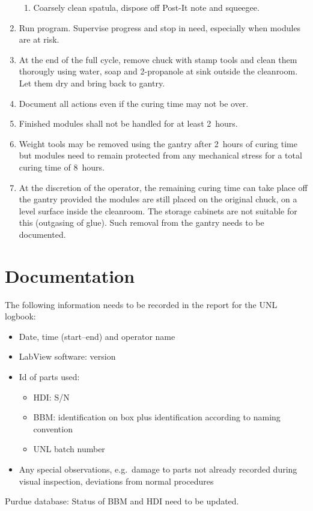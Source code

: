 \documentclass[12pt]{unlsilabsop}
\begin{document}
\begin{enumerate}
\begin{enumerate}
	\item Coarsely clean spatula, dispose off Post-It note and squeegee.
    \end{enumerate}
    \item Run program. Supervise progress and stop in need, especially when modules are at risk.
    \item At the end of the full cycle, remove chuck with stamp tools and clean them thorougly using water, soap and 2-propanole at sink outside the cleanroom. Let them dry and bring back to gantry.
    \item Document all actions even if the curing time may not be over.
    \item Finished modules shall not be handled for at least 2~hours.
    \item Weight tools may be removed using the gantry after 2~hours of curing time but modules need to remain protected from any mechanical stress for a total curing time of 8~hours.
    \item At the discretion of the operator, the remaining curing time can take place off the gantry provided the modules are still placed on the original chuck, on a level surface inside the cleanroom. The storage cabinets are not suitable for this (outgasing of glue). Such removal from the gantry needs to be documented.
\end{enumerate}

\section{Documentation}
The following information needs to be recorded in the report for the UNL logbook:
\begin{itemize}
    \item Date, time (start--end) and operator name
    \item LabView software: version
    \item Id of parts used:
	\begin{itemize}
	    \item HDI: S/N
	    \item BBM: identification on box plus identification according to naming convention
	    \item UNL batch number
	\end{itemize}
    \item Any special observations, e.g.~damage to parts not already recorded during visual inspection, deviations from normal procedures
\end{itemize}

Purdue database: Status of BBM and HDI need to be updated.
\end{document}
